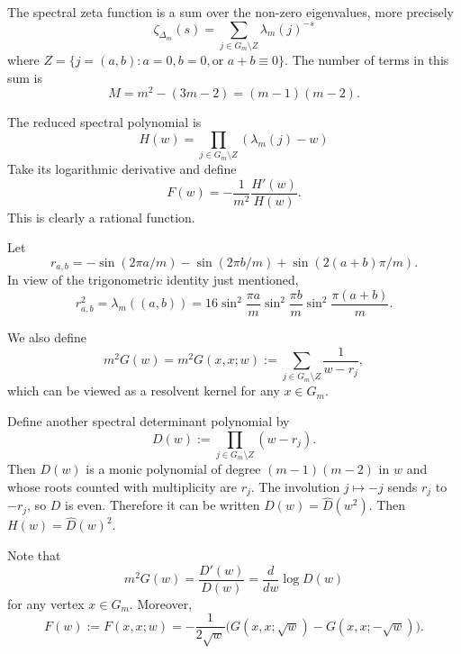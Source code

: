 \documentclass[11pt,reqno]{amsart}
\theoremstyle{remark}
\begin{document}

The spectral zeta function is a sum over the non-zero eigenvalues, more precisely
$$
\zeta_{\Delta_m}(s)= \sum_{j\in G_m \setminus Z} \lambda_m (j)^{-s}
$$
where $Z= \{ j=(a,b):a=0, b=0, \mathrm{ or }\,\, a+b \equiv 0 \}.$ The number of terms in this sum is
\[
M = m^2-(3m-2) = (m-1)(m-2).
\]

The reduced spectral polynomial is
$$
H(w)=\prod_{j\in G_m \setminus Z}(\lambda_m(j)-w)
$$
Take its logarithmic derivative and define
$$
F(w)=-\frac{1}{m^2}\frac{H'(w)}{H(w)}.
$$
This is clearly a rational function.


Let
\[
 r_{a,b}
 =-\sin(2\pi a/m)-\sin (2\pi b/m)+\sin(2(a+b)\pi /m).
\]
In view of the trigonometric identity just mentioned,
$$
 r_{a,b}^2=\lambda_m((a,b))
 =16\sin^2\frac{\pi a}{m}\sin^2\frac{\pi b}{m}
 \sin^2\frac{\pi(a+b)}{m}.
 $$

We also define
\[
m^2 G(w)=m^{2} G(x,x;w) := \sum_{j\in G_m\setminus Z}\frac{1}{w-r_j},
\]
which can be viewed as a resolvent kernel for any $x\in G_m$.

Define another spectral determinant polynomial by
\begin{equation}\label{eq:det_polynomial}
D(w) := \prod_{j\in G_m \setminus Z}(w-r_j).
\end{equation}
Then $D(w)$ is
a monic polynomial of degree $(m-1)(m-2)$ in $w$ and whose roots counted
with multiplicity are
$r_j$.
The involution $j\mapsto-j$ sends $r_j$ to $-r_j$, so $D$ is even. Therefore it can be written $D(w)=\hat {D}(w^2)$. Then $H(w)=\hat{D}(w)^2$.


Note that
\[
m^{2}G(w) = \frac{D'(w)}{D(w)} = \frac{d}{dw}\log D(w)
\]
for any vertex $x \in G_{m}$. Moreover,
\[
F(w):= F(x,x;w)=-\frac1{2\sqrt w}
 \bigl(G(x,x;\sqrt w)-G(x,x;-\sqrt w)\bigr).
\]
\end{document}
